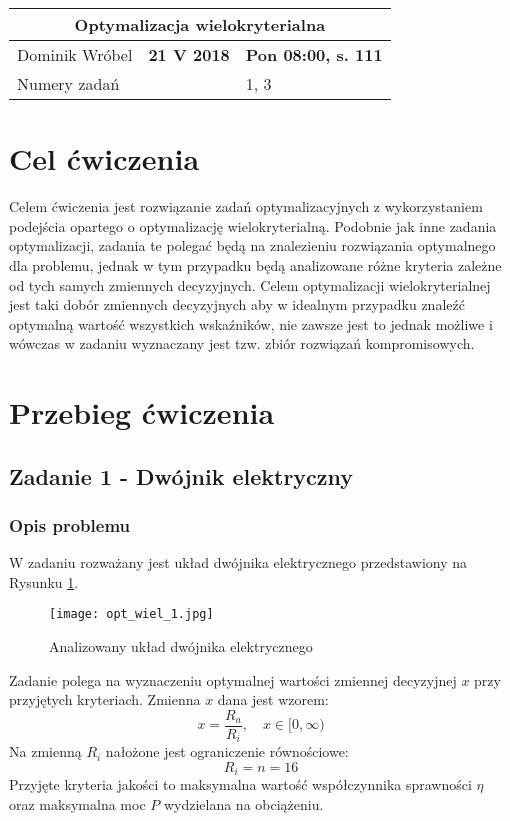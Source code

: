 \documentclass[a4paper,15pt]{article}
\begin{document}
\tableofcontents


\begin{table}
\begin{center}
\begin{tabular}{|l|l|l|}
\hline
\multicolumn{3}{|c|}{\textbf{Optymalizacja wielokryterialna}} \\ \hline Dominik Wróbel & \textbf{21 V 2018} & \textbf{Pon 08:00, s. 111} \\ \hline
\multicolumn{2}{|l|}{Numery zadań} & 1, 3 \\ \hline 

\end{tabular}
\end{center}
\end{table}

\section{Cel ćwiczenia}
Celem ćwiczenia jest rozwiązanie zadań optymalizacyjnych z wykorzystaniem podejścia opartego o optymalizację wielokryterialną. Podobnie jak inne zadania optymalizacji, zadania te polegać będą na znalezieniu rozwiązania optymalnego dla problemu, jednak w tym przypadku będą analizowane różne kryteria zależne od tych samych zmiennych decyzyjnych. Celem optymalizacji wielokryterialnej jest taki dobór zmiennych decyzyjnych aby w idealnym przypadku znaleźć optymalną wartość wszystkich wskaźników, nie zawsze jest to jednak możliwe i wówczas w zadaniu wyznaczany jest tzw. zbiór rozwiązań kompromisowych. 
\newpage
\section{Przebieg ćwiczenia}
\subsection{Zadanie 1 - Dwójnik elektryczny }
\subsubsection{Opis problemu}
W zadaniu rozważany jest układ dwójnika elektrycznego przedstawiony na Rysunku \ref{fig:opt_wiel_1}.
\begin{figure}[H]
\centerline{\texttt{[image: opt\_wiel\_1.jpg]}}
\centering
\caption{Analizowany układ dwójnika elektrycznego}
\label{fig:opt_wiel_1}
\end{figure}
Zadanie polega na wyznaczeniu optymalnej wartości zmiennej decyzyjnej \(x\) przy przyjętych kryteriach. Zmienna \(x\) dana jest wzorem:
\begin{equation*}
x=\frac{R_{a}}{R_{i}}, \quad x \in [0, \infty )
\end{equation*} 
Na zmienną \(R_{i}\) nałożone jest ograniczenie równościowe: \\
\begin{equation*}
R_{i} = n = 16
\end{equation*}
Przyjęte kryteria jakości to maksymalna wartość współczynnika sprawności \( \eta \) oraz maksymalna moc \( P \) wydzielana na obciążeniu.
\pagestyle{mypage}
\end{document}
